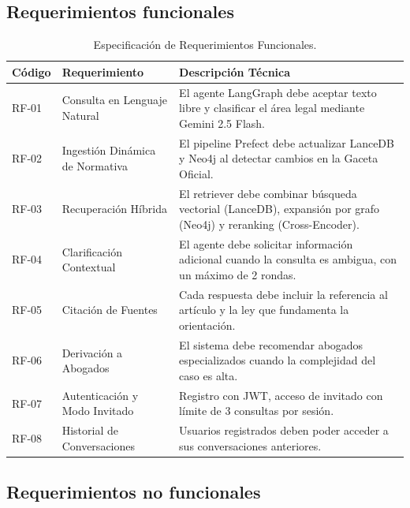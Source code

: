 \documentclass[12pt, letterpaper]{report}
\begin{document}
\subsection{Requerimientos funcionales}

\begin{table}[H]
  \centering
  \renewcommand{\arraystretch}{1.3}
  \caption{Especificaci\'{o}n de Requerimientos Funcionales.}
  \label{tab:req_funcionales}
  \begin{tabular}{|p{}|p{}|p{}|}
  \hline
  \textbf{C\'{o}digo} & \textbf{Requerimiento} & \textbf{Descripci\'{o}n T\'{e}cnica} \\ \hline
  RF-01 & Consulta en Lenguaje Natural & El agente LangGraph debe aceptar texto libre y clasificar el \'{a}rea legal mediante Gemini 2.5 Flash. \\ \hline
  RF-02 & Ingesti\'{o}n Din\'{a}mica de Normativa & El pipeline Prefect debe actualizar LanceDB y Neo4j al detectar cambios en la Gaceta Oficial. \\ \hline
  RF-03 & Recuperaci\'{o}n H\'{i}brida & El retriever debe combinar b\'{u}squeda vectorial (LanceDB), expansi\'{o}n por grafo (Neo4j) y reranking (Cross-Encoder). \\ \hline
  RF-04 & Clarificaci\'{o}n Contextual & El agente debe solicitar informaci\'{o}n adicional cuando la consulta es ambigua, con un m\'{a}ximo de 2 rondas. \\ \hline
  RF-05 & Citaci\'{o}n de Fuentes & Cada respuesta debe incluir la referencia al art\'{i}culo y la ley que fundamenta la orientaci\'{o}n. \\ \hline
  RF-06 & Derivaci\'{o}n a Abogados & El sistema debe recomendar abogados especializados cuando la complejidad del caso es alta. \\ \hline
  RF-07 & Autenticaci\'{o}n y Modo Invitado & Registro con JWT, acceso de invitado con l\'{i}mite de 3 consultas por sesi\'{o}n. \\ \hline
  RF-08 & Historial de Conversaciones & Usuarios registrados deben poder acceder a sus conversaciones anteriores. \\ \hline
  \end{tabular}
\end{table}

\subsection{Requerimientos no funcionales}
\end{document}

